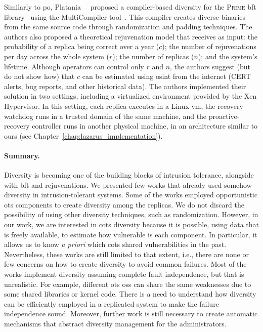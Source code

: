Similarly to \gls{po}, Platania~\etal{}~\cite{Platania:2014} proposed a compiler-based diversity for the \textsc{Prime} \gls{bft} library~\cite{Amir:2011} using the MultiCompiler tool~\cite{Homescu:2013}. 
This compiler creates diverse binaries from the same source code through randomization and padding techniques.
The authors also proposed a theoretical rejuvenation model that receives as input: the probability of a replica being correct over a year ($c$); the number of rejuvenations per day across the whole system ($r$); the number of replicas ($n$); and the system's lifetime. 
Although operators can control only $r$ and $n$, the authors suggest (but do not show how) that $c$ can be estimated using \gls{osint} from the internet (CERT alerts, bug reports, and other historical data).
The authors implemented their solution in two settings, including a virtualized environment provided by the Xen Hypervisor.
In this setting, each replica executes in a Linux \gls{vm}, the recovery watchdog runs in a trusted domain of the same machine, and the proactive-recovery controller runs in another physical machine, in an architecture similar to ours (see Chapter~\ref{chap:lazarus_implementation}).


\paragraph{Summary.} 
Diversity is becoming one of the building blocks of intrusion tolerance, alongside with \gls{bft} and rejuvenations. 
We presented few works that already used somehow diversity in intrusion-tolerant systems. Some of the works employed opportunistic \gls{ots} components to create diversity among the replicas. 
We do not discard the possibility of using other diversity techniques, such as randomization. 
However, in our work, we are interested in \gls{cots} diversity because it is possible, using data that is freely available, to estimate how vulnerable is each component. 
In particular, it allows us to know \emph{a priori} which \gls{cots} shared vulnerabilities in the past.
Nevertheless, these works are still limited to that extent, i.e., there are none or few concerns on how to create diversity to avoid common failures. 
Most of the works implement diversity assuming complete fault independence, but that is unrealistic. 
For example, different \gls{ots} \glspl{os} can share the same weaknesses due to some shared libraries or kernel code. 
There is a need to understand how diversity can be efficiently employed in a replicated system to make the failure independence sound. 
Moreover, further work is still necessary to create automatic mechanisms that abstract diversity management for the administrators.



